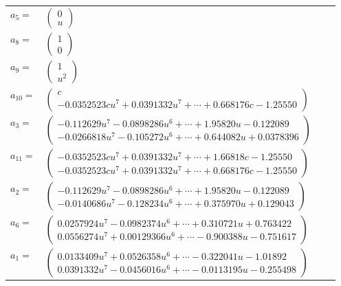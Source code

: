 \documentclass[1p]{elsarticle_modified}
\theoremstyle{definition}
\begin{document}
\begin{tabular}{m{7pt} m{180pt} m{7pt} m{180pt} }
\flushright $a_{5}=$&$\begin{pmatrix}0\\u\end{pmatrix}$ \\
\flushright $a_{8}=$&$\begin{pmatrix}1\\0\end{pmatrix}$ \\
\flushright $a_{9}=$&$\begin{pmatrix}1\\u^2\end{pmatrix}$ \\
\flushright $a_{10}=$&$\begin{pmatrix}c\\-0.0352523 c u^{7}+0.0391332 u^{7}+\cdots+0.668176 c-1.25550\end{pmatrix}$ \\
\flushright $a_{3}=$&$\begin{pmatrix}-0.112629 u^{7}-0.0898286 u^{6}+\cdots+1.95820 u-0.122089\\-0.0266818 u^{7}-0.105272 u^{6}+\cdots+0.644082 u+0.0378396\end{pmatrix}$ \\
\flushright $a_{11}=$&$\begin{pmatrix}-0.0352523 c u^{7}+0.0391332 u^{7}+\cdots+1.66818 c-1.25550\\-0.0352523 c u^{7}+0.0391332 u^{7}+\cdots+0.668176 c-1.25550\end{pmatrix}$ \\
\flushright $a_{2}=$&$\begin{pmatrix}-0.112629 u^{7}-0.0898286 u^{6}+\cdots+1.95820 u-0.122089\\-0.0140686 u^{7}-0.128234 u^{6}+\cdots+0.375970 u+0.129043\end{pmatrix}$ \\
\flushright $a_{6}=$&$\begin{pmatrix}0.0257924 u^{7}-0.0982374 u^{6}+\cdots+0.310721 u+0.763422\\0.0556274 u^{7}+0.00129366 u^{6}+\cdots-0.900388 u-0.751617\end{pmatrix}$ \\
\flushright $a_{1}=$&$\begin{pmatrix}0.0133409 u^{7}+0.0526358 u^{6}+\cdots-0.322041 u-1.01892\\0.0391332 u^{7}-0.0456016 u^{6}+\cdots-0.0113195 u-0.255498\end{pmatrix}$ \\

\end{tabular}
\end{document}
